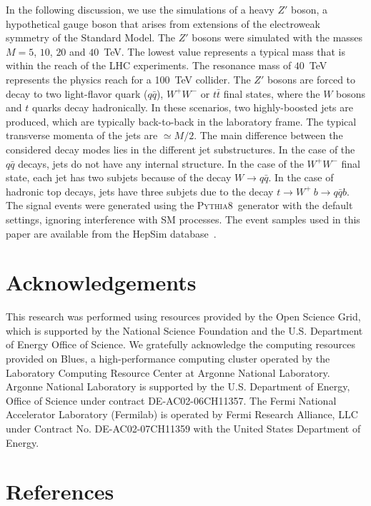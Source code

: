 \documentclass[final,1p,11pt]{elsarticle}
\newcommand{\pythia} {\textsc{Pythia8~}}
\begin{document}
In the following discussion, we use the simulations of a heavy $Z'$ boson, 
a hypothetical gauge boson  that arises from extensions of the electroweak symmetry of the Standard Model.
The $Z'$ bosons were simulated with the masses $M=5$, $10$, $20$ and $40$~TeV. The lowest value 
represents a typical mass that is within the reach of the LHC experiments. The  resonance mass of $40$~TeV 
represents the physics reach for a  100~TeV collider. The $Z'$ bosons are forced to decay to two light-flavor quark ($q\bar{q}$), $W^+W^-$ or $t\bar{t}$ final states, where the 
$W$ bosons and $t$ quarks decay hadronically. In these scenarios, two highly-boosted
jets are produced,  which are typically back-to-back in the laboratory frame.
The typical transverse momenta of the jets are $\simeq M/2$.
The main difference between the considered decay modes lies in the different jet substructures. In the case of the $q\bar{q}$ decays,
jets do not have any internal structure. In the case of the $W^+W^-$ final state, each jet has two subjets  because of the decay $W\rightarrow q\bar{q}$. In the case of hadronic top decays, jets have three subjets due
to the decay $t \rightarrow  W^+\>b \rightarrow q\bar{q} b$.    
The signal events were generated using the \pythia generator with the default settings,
ignoring interference with SM processes.
The event samples used in this paper are  available from the
HepSim  database~\cite{Chekanov:2014fga}.















\section*{Acknowledgements}
This research was performed using resources provided by the Open Science Grid,
which is supported by the National Science Foundation and the U.S. Department of Energy Office of Science. 
We gratefully acknowledge the computing resources provided on Blues, 
a high-performance computing cluster operated by the Laboratory Computing Resource Center at Argonne National Laboratory.
Argonne National Laboratory is supported by the U.S. Department of Energy, Office of Science under contract DE-AC02-06CH11357. The Fermi National Accelerator Laboratory (Fermilab) is operated by Fermi Research Alliance, LLC under Contract No. DE-AC02-07CH11359 with the United States Department of Energy.

\newpage
\section*{References}


\def\bibname{\Large\bf References}
\def\refname{\Large\bf References}
\pagestyle{plain}

\end{document}
